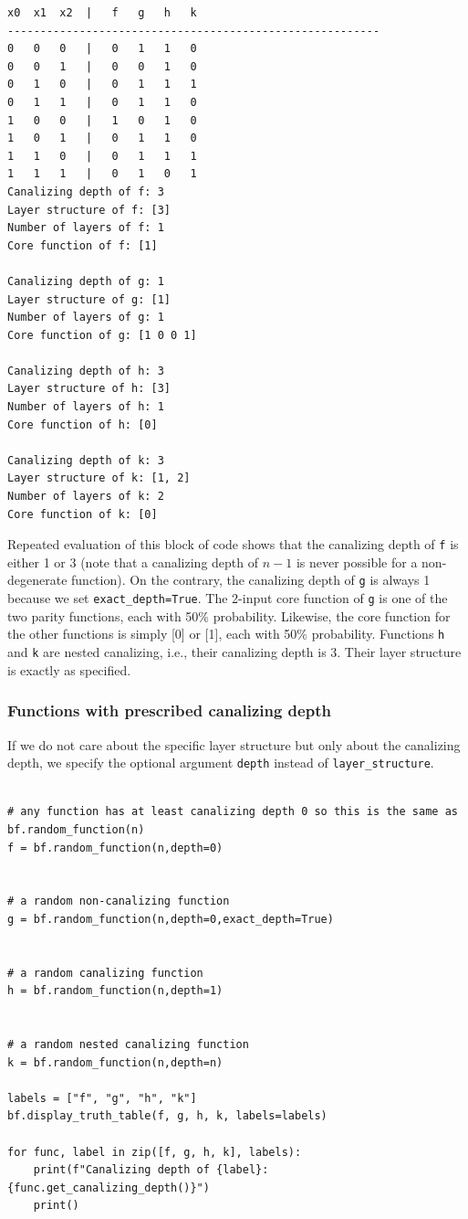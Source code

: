 \documentclass[
]{article}
\begin{document}
\begin{lstlisting}
x0  x1  x2  |   f   g   h   k
---------------------------------------------------------
0   0   0   |   0   1   1   0
0   0   1   |   0   0   1   0
0   1   0   |   0   1   1   1
0   1   1   |   0   1   1   0
1   0   0   |   1   0   1   0
1   0   1   |   0   1   1   0
1   1   0   |   0   1   1   1
1   1   1   |   0   1   0   1
Canalizing depth of f: 3
Layer structure of f: [3]
Number of layers of f: 1
Core function of f: [1]

Canalizing depth of g: 1
Layer structure of g: [1]
Number of layers of g: 1
Core function of g: [1 0 0 1]

Canalizing depth of h: 3
Layer structure of h: [3]
Number of layers of h: 1
Core function of h: [0]

Canalizing depth of k: 3
Layer structure of k: [1, 2]
Number of layers of k: 2
Core function of k: [0]
\end{lstlisting}

Repeated evaluation of this block of code shows that the canalizing
depth of \texttt{f} is either 1 or 3 (note that a canalizing depth of
\(n-1\) is never possible for a non-degenerate function). On the
contrary, the canalizing depth of \texttt{g} is always 1 because we set
\texttt{exact\_depth=True}. The 2-input core function of \texttt{g} is
one of the two parity functions, each with 50\% probability. Likewise,
the core function for the other functions is simply {[}0{]} or {[}1{]},
each with 50\% probability. Functions \texttt{h} and \texttt{k} are
nested canalizing, i.e., their canalizing depth is 3. Their layer
structure is exactly as specified.

\subsubsection{Functions with prescribed canalizing
depth}\label{functions-with-prescribed-canalizing-depth}

If we do not care about the specific layer structure but only about the
canalizing depth, we specify the optional argument \texttt{depth}
instead of \texttt{layer\_structure}.

\begin{lstlisting}

# any function has at least canalizing depth 0 so this is the same as bf.random_function(n)
f = bf.random_function(n,depth=0)


# a random non-canalizing function
g = bf.random_function(n,depth=0,exact_depth=True)


# a random canalizing function
h = bf.random_function(n,depth=1)


# a random nested canalizing function
k = bf.random_function(n,depth=n)

labels = ["f", "g", "h", "k"]
bf.display_truth_table(f, g, h, k, labels=labels)

for func, label in zip([f, g, h, k], labels):
    print(f"Canalizing depth of {label}: {func.get_canalizing_depth()}")
    print()
\end{lstlisting}
\end{document}
